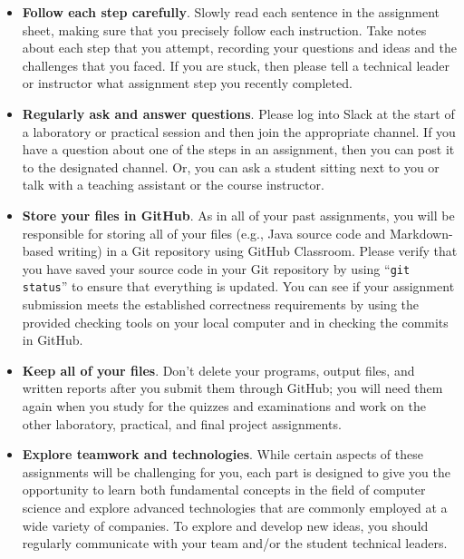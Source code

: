 \documentclass[11pt]{article}
\newcommand{\command}[1]{``\lstinline{#1}''}
\begin{document}
\begin{itemize}
  \setlength{\itemsep}{0pt}

\item {\bf Follow each step carefully}. Slowly read each sentence in the
  assignment sheet, making sure that you precisely follow each instruction.
  Take notes about each step that you attempt, recording your questions and
  ideas and the challenges that you faced. If you are stuck, then please tell a
  technical leader or instructor what assignment step you recently completed.

\item {\bf Regularly ask and answer questions}. Please log into Slack at the
  start of a laboratory or practical session and then join the appropriate
  channel. If you have a question about one of the steps in an assignment, then
  you can post it to the designated channel. Or, you can ask a student sitting
  next to you or talk with a teaching assistant or the course instructor.

\item {\bf Store your files in GitHub}. As in all of your past assignments, you
  will be responsible for storing all of your files (e.g., Java source code and
  Markdown-based writing) in a Git repository using GitHub Classroom. Please
  verify that you have saved your source code in your Git repository by using
  \command{git status} to ensure that everything is updated. You can see if
  your assignment submission meets the established correctness requirements by
  using the provided checking tools on your local computer and in checking the
  commits in GitHub.

\item {\bf Keep all of your files}. Don't delete your programs, output files,
  and written reports after you submit them through GitHub; you will need them
  again when you study for the quizzes and examinations and work on the other
  laboratory, practical, and final project assignments.

\item {\bf Explore teamwork and technologies}. While certain aspects of these
  assignments will be challenging for you, each part is designed to give you the
  opportunity to learn both fundamental concepts in the field of computer
  science and explore advanced technologies that are commonly employed at a wide
  variety of companies. To explore and develop new ideas, you should regularly
  communicate with your team and/or the student technical leaders.


\end{itemize}
\end{document}
